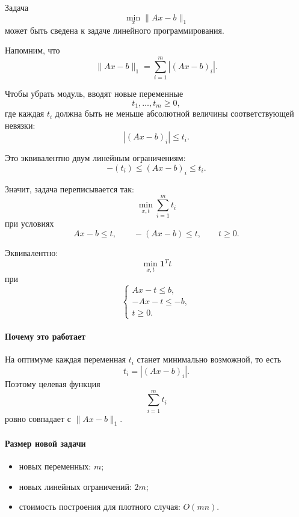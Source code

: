 	Задача
	\[
	\min_x \|Ax-b\|_1
	\]
	может быть сведена к задаче линейного программирования.
	
	Напомним, что
	\[
	\|Ax-b\|_1=\sum_{i=1}^m |(Ax-b)_i|.
	\]
	
	Чтобы убрать модуль, вводят новые переменные
	\[
	t_1,\dots,t_m \ge 0,
	\]
	где каждая \(t_i\) должна быть не меньше абсолютной величины соответствующей невязки:
	\[
	|(Ax-b)_i| \le t_i.
	\]
	
	Это эквивалентно двум линейным ограничениям:
	\[
	-(t_i) \le (Ax-b)_i \le t_i.
	\]
	
	Значит, задача переписывается так:
	\[
	\min_{x,t} \sum_{i=1}^m t_i
	\]
	при условиях
	\[
	Ax-b \le t,
	\qquad
	-(Ax-b) \le t,
	\qquad
	t \ge 0.
	\]
	
	Эквивалентно:
	\[
	\min_{x,t} \mathbf{1}^T t
	\]
	при
	\[
	\begin{cases}
		Ax - t \le b,\\
		-Ax - t \le -b,\\
		t \ge 0.
	\end{cases}
	\]
	
	\paragraph{Почему это работает}
	На оптимуме каждая переменная \(t_i\) станет минимально возможной, то есть
	\[
	t_i = |(Ax-b)_i|.
	\]
	Поэтому целевая функция
	\[
	\sum_{i=1}^m t_i
	\]
	ровно совпадает с \(\|Ax-b\|_1\).
	
	\paragraph{Размер новой задачи}
	\begin{itemize}
		\item новых переменных: \(m\);
		\item новых линейных ограничений: \(2m\);
		\item стоимость построения для плотного случая: \(O(mn)\).
	\end{itemize}
	
